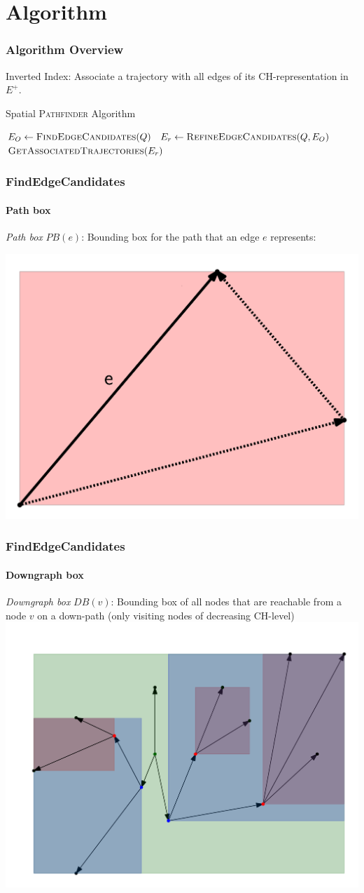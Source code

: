 \documentclass{beamer}
\newcommand{\pathfinder}{\textsc{Pathfinder}\xspace}
\newcommand{\findEdgeCandidates}{FindEdgeCandidates\xspace}
\newcommand{\refineEdgeCandidates}{RefineEdgeCandidates\xspace}
\newcommand{\getAssociatedTrajectories}{GetAssociatedTrajectories\xspace}
\newcommand{\chrep}{CH-representation\xspace}
\begin{document}
\section{Algorithm}

\begin{frame}
	\frametitle{Algorithm Overview}
	Inverted Index: Associate a trajectory with all edges of its \chrep in $E^+$. \pause
	\begin{algorithm}[H]
		\renewcommand{\thealgorithm}{}
		{\small
			\caption{Spatial \pathfinder Algorithm}
			\begin{algorithmic}[1]
				 \pause
				\State $E_O \gets \Call{\findEdgeCandidates}{Q}$ \label{line:edge_revrieval} \pause
				\State $E_r \gets \Call{\refineEdgeCandidates}{Q, E_O}$ \pause
				\State \Return $\Call{\getAssociatedTrajectories}{E_r}$
				\EndProcedure
			\end{algorithmic}
			\label{alg:spatial_pathfinder}
		}
	\end{algorithm}
\end{frame}

\begin{frame}
	\frametitle{\findEdgeCandidates}
	\framesubtitle{Path box}
	\emph{Path box} $PB(e)$: Bounding box for the path that an edge $e$ represents:

	\includegraphics[width=.5\columnwidth]{images/pathBox}
\end{frame}

\begin{frame}
	\frametitle{\findEdgeCandidates}
	\framesubtitle{Downgraph box}
	\emph{Downgraph box} $DB(v)$: Bounding box of all nodes that are reachable from a node $v$ on a down-path (only visiting nodes of decreasing CH-level)
	\includegraphics[width=.76\columnwidth]{images/downgraphBox}
\end{frame}
\end{document}
